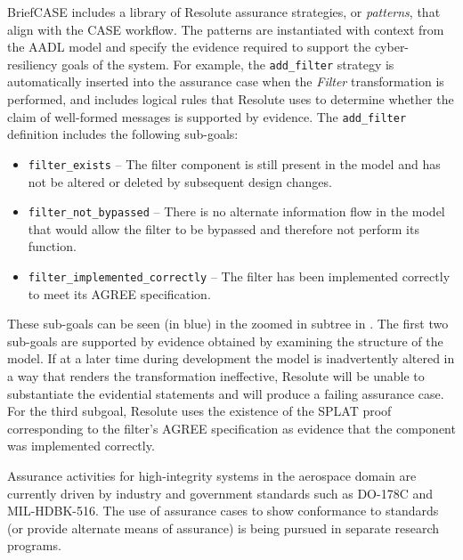 BriefCASE includes a library of Resolute assurance strategies, or \emph{patterns}, that align with
the CASE workflow. The patterns are instantiated with context from the AADL model and specify the
evidence required to support the cyber-resiliency goals of the system. For example, the
\texttt{add\_filter} strategy is automatically inserted into the assurance case when the
\textit{Filter} transformation is performed, and includes logical rules that Resolute uses to
determine whether the claim of well-formed messages is supported by evidence. The \texttt{add\_filter}
definition 
includes the following sub-goals:
\begin{itemize} 
\item \texttt{filter\_exists} -- The filter component is still present in the model and has not be 
altered or deleted by subsequent design changes. 
\item \texttt{filter\_not\_bypassed} -- There is no alternate information flow in the model that 
would allow the filter to be bypassed and therefore not perform its function.   
\item \texttt{filter\_implemented\_correctly} -- The filter has been implemented correctly 
to meet its AGREE specification.  
\end{itemize}
These sub-goals can be seen (in blue) in the zoomed in subtree in .
The first two sub-goals are supported by evidence obtained by examining the structure of the model. 
If at a later time during development the model is inadvertently altered in a way that renders the transformation
ineffective, Resolute will be unable to substantiate the evidential statements and will
produce a failing assurance case.
%
For the third subgoal, Resolute uses the existence of the
SPLAT proof corresponding to the filter's AGREE specification
as evidence that the component was implemented correctly.

Assurance activities for high-integrity systems in the aerospace domain are currently driven 
by industry and government standards such as DO-178C and MIL-HDBK-516.  The use of assurance 
cases to show conformance to standards (or provide alternate means of assurance) is being pursued 
in separate research programs.  




